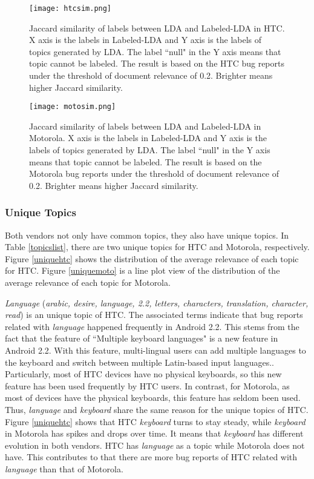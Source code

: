 \documentclass[10pt, conference, compsocconf]{IEEEtran}
\begin{document}
\begin{figure*}[htb]
\centering
\texttt{[image: htcsim.png]}
\caption{Jaccard similarity of labels between LDA and Labeled-LDA in HTC. X axis is the labels in Labeled-LDA and Y axis is the labels of topics generated by LDA. The label ``null" in the Y axis means that topic cannot be labeled. The result is based on the HTC bug reports under the threshold of document relevance of 0.2. Brighter means higher Jaccard similarity.}
\label{similarityhtc}
\end{figure*}

\begin{figure*}[htb]
\centering
\texttt{[image: motosim.png]}
\caption{Jaccard similarity of labels between LDA and Labeled-LDA in Motorola. X axis is the labels in Labeled-LDA and Y axis is the labels of topics generated by LDA. The label ``null" in the Y axis means that topic cannot be labeled. The result is based on the Motorola bug reports under the threshold of document relevance of 0.2. Brighter means higher Jaccard similarity.}
\label{similaritymoto}
\end{figure*}


\subsubsection{Unique Topics}
Both vendors not only have common topics, they also have unique topics. In Table \ref{topicslist}, there are two unique topics for HTC and Motorola, respectively. Figure \ref{uniquehtc} shows the distribution of the average relevance of each topic for HTC. Figure \ref{uniquemoto} is a line plot view of the distribution of the average relevance of each topic for Motorola.

\textit{Language} (\textit{arabic, desire, language, 2.2, letters, characters, translation, character, read}) is an unique topic of HTC. The associated terms indicate that bug reports related with \textit{language} happened frequently in Android 2.2. This stems from the fact that the feature of ``Multiple keyboard languages" is a new feature in Android 2.2. With this feature, multi-lingual users can add multiple languages to the keyboard and switch between multiple Latin-based input languages.\cite{androidwebsite}. Particularly, most of HTC devices have no physical keyboards, so this new feature has been used frequently by HTC users. In contrast, for Motorola, as most of devices have the physical keyboards, this feature has seldom been used. Thus, \textit{language} and \textit{keyboard} share the same reason for the unique topics of HTC. Figure \ref{uniquehtc} shows that HTC \textit{keyboard} turns to stay steady, while \textit{keyboard} in Motorola has spikes and drops over time. It means that \textit{keyboard} has different evolution in both vendors. HTC has \textit{language} as a topic while Motorola does not have. This contributes to that there are more bug reports of HTC related with \textit{language} than that of Motorola.
\end{document}

